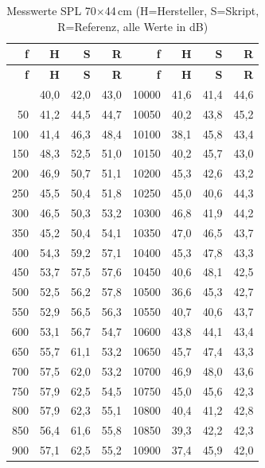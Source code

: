 \begin{small}
\setlength{\tabcolsep}{2pt}
\renewcommand{\arraystretch}{1.0}
\begin{longtable}{|r|r|r|r|r|r|r|r|}
\caption{Messwerte SPL 70$\times$44\,cm (H=Hersteller, S=Skript, R=Referenz, alle Werte in dB)} \\
\hline
\textbf{f} & \textbf{H} & \textbf{S} & \textbf{R} & \textbf{f} & \textbf{H} & \textbf{S} & \textbf{R} \\
\hline
\endfirsthead
\hline
\textbf{f} & \textbf{H} & \textbf{S} & \textbf{R} & \textbf{f} & \textbf{H} & \textbf{S} & \textbf{R} \\
\hline
\endhead
\hline
\endfoot
\hline
\endlastfoot
25 & 40,0 & 42,0 & 43,0 & 10000 & 41,6 & 41,4 & 44,6 \\ \hline
50 & 41,2 & 44,5 & 44,7 & 10050 & 40,2 & 43,8 & 45,2 \\ \hline
100 & 41,4 & 46,3 & 48,4 & 10100 & 38,1 & 45,8 & 43,4 \\ \hline
150 & 48,3 & 52,5 & 51,0 & 10150 & 40,2 & 45,7 & 43,0 \\ \hline
200 & 46,9 & 50,7 & 51,1 & 10200 & 45,3 & 42,6 & 43,2 \\ \hline
250 & 45,5 & 50,4 & 51,8 & 10250 & 45,0 & 40,6 & 44,3 \\ \hline
300 & 46,5 & 50,3 & 53,2 & 10300 & 46,8 & 41,9 & 44,2 \\ \hline
350 & 45,2 & 50,4 & 54,1 & 10350 & 47,0 & 46,5 & 43,7 \\ \hline
400 & 54,3 & 59,2 & 57,1 & 10400 & 45,3 & 47,8 & 43,3 \\ \hline
450 & 53,7 & 57,5 & 57,6 & 10450 & 40,6 & 48,1 & 42,5 \\ \hline
500 & 52,5 & 56,2 & 57,8 & 10500 & 36,6 & 45,3 & 42,7 \\ \hline
550 & 52,9 & 56,5 & 56,3 & 10550 & 40,7 & 40,6 & 43,7 \\ \hline
600 & 53,1 & 56,7 & 54,7 & 10600 & 43,8 & 44,1 & 43,4 \\ \hline
650 & 55,7 & 61,1 & 53,2 & 10650 & 45,7 & 47,4 & 43,3 \\ \hline
700 & 57,5 & 62,0 & 53,2 & 10700 & 46,9 & 48,0 & 43,6 \\ \hline
750 & 57,9 & 62,5 & 54,5 & 10750 & 45,0 & 45,6 & 42,3 \\ \hline
800 & 57,9 & 62,3 & 55,1 & 10800 & 40,4 & 41,2 & 42,8 \\ \hline
850 & 56,4 & 61,6 & 55,8 & 10850 & 39,3 & 42,2 & 42,3 \\ \hline
900 & 57,1 & 62,5 & 55,2 & 10900 & 37,4 & 45,9 & 42,0 \\ \hline

\end{longtable}
\end{small}
